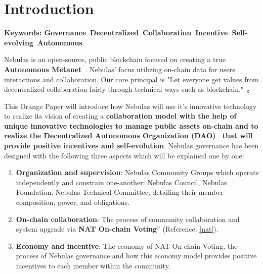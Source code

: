 
\section{Introduction}

\textbf{Keywords: Governance\ Decentralized\ Collaboration\ Incentive\ Self-evolving\ Autonomous }

\vspace{2em}

Nebulas is an open-source, public blockchain focused on creating a true \textbf{Autonomous Metanet}~\cite{AutonomousMetanet}. Nebulas' focus utilizing on-chain data for users interactions and collaboration. Our core principal is "Let everyone get values from decentralized collaboration fairly through technical ways such as blockchain."~\cite{vision}。

This Orange Paper will introduce how Nebulas will use it's innovative technology to realize its vision of creating a \textbf{collaboration model with the help of unique innovative technologies to manage public assets on-chain and to realize the Decentralized Autonomous Organization (DAO)~\cite{DAO} that will provide positive incentives and self-evolution}. Nebulas governance has been designed with the following three aspects which will be explained one by one:

\begin{enumerate}
	\item \textbf{Organization and supervision}:
	Nebulas Community Groups which operate independently and constrain one-another: Nebulas Council, Nebulas Foundation, Nebulas Technical Committee; detailing their member composition, power, and obligations.
	\item \textbf{On-chain collaboration}:
	The process of community collaboration and system upgrade via \textbf{NAT On-chain Voting}” (Reference: \ref{nat}).
	\item \textbf{Economy and incentive}: 
	The economy of NAT On-chain Voting, the process of Nebulas governance and how this economy model provides positive incentives to each member within the community.
\end{enumerate}
